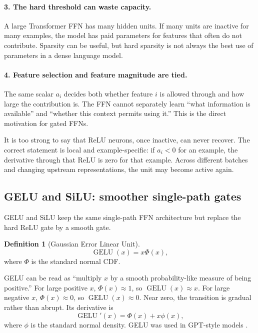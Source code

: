 \documentclass[11pt,a4paper]{article}
\theoremstyle{definition}
\newtheorem{definition}{Definition}[section]
\theoremstyle{plain}
\DeclareMathOperator{\GELU}{GELU}
\begin{document}
\paragraph{3. The hard threshold can waste capacity.}
A large Transformer FFN has many hidden units. If many units are inactive for many examples, the model has paid parameters for features that often do not contribute. Sparsity can be useful, but hard sparsity is not always the best use of parameters in a dense language model.

\paragraph{4. Feature selection and feature magnitude are tied.}
The same scalar $a_i$ decides both whether feature $i$ is allowed through and how large the contribution is. The FFN cannot separately learn ``what information is available'' and ``whether this context permits using it.'' This is the direct motivation for gated FFNs.

\begin{warningbox}
It is too strong to say that ReLU neurons, once inactive, can never recover. The correct statement is local and example-specific: if $a_i<0$ for an example, the derivative through that ReLU is zero for that example. Across different batches and changing upstream representations, the unit may become active again.
\end{warningbox}

\subsection{GELU and SiLU: smoother single-path gates}

GELU and SiLU keep the same single-path FFN architecture but replace the hard ReLU gate by a smooth gate.

\begin{definition}[Gaussian Error Linear Unit]
\begin{equation}\label{eq:gelu}
    \GELU(x)=x\Phi(x),
\end{equation}
where $\Phi$ is the standard normal CDF.
\end{definition}

GELU can be read as ``multiply $x$ by a smooth probability-like measure of being positive.'' For large positive $x$, $\Phi(x)\approx 1$, so $\GELU(x)\approx x$. For large negative $x$, $\Phi(x)\approx 0$, so $\GELU(x)\approx 0$. Near zero, the transition is gradual rather than abrupt. Its derivative is
\begin{equation}
    \GELU'(x)=\Phi(x)+x\phi(x),
\end{equation}
where $\phi$ is the standard normal density. GELU was used in GPT-style models \cite{hendrycks2016gelu,radford2019gpt2}.
\end{document}
